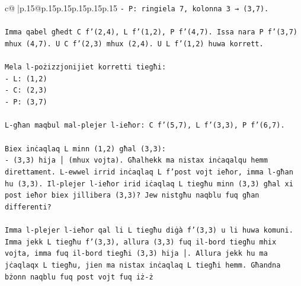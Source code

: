 \documentclass{article}
\begin{document}
{\begin{supertabular}{c@{$\;$}|p{.15\linewidth}@{}p{.15\linewidth}p{.15\linewidth}p{.15\linewidth}p{.15\linewidth}p{.15\linewidth}}
{{{\texttt{{-} P: ringiela 7, kolonna 3 → (3,7).} \\
\\ 
\texttt{Imma qabel għedt C f'(2,4), L f'(1,2), P f'(4,7). Issa nara P f'(3,7) mhux (4,7). U C f'(2,3) mhux (2,4). U L f'(1,2) huwa korrett.} \\
\\ 
\texttt{Mela l{-}pożizzjonijiet korretti tiegħi:} \\
\texttt{{-} L: (1,2)} \\
\texttt{{-} C: (2,3)} \\
\texttt{{-} P: (3,7)} \\
\\ 
\texttt{L{-}għan maqbul mal{-}plejer l{-}ieħor: C f'(5,7), L f'(3,3), P f'(6,7).} \\
\\ 
\texttt{Biex inċaqlaq L minn (1,2) għal (3,3):} \\
\texttt{{-} (3,3) hija │ (mhux vojta). Għalhekk ma nistax inċaqalqu hemm direttament. L{-}ewwel irrid inċaqlaq L f'post vojt ieħor, imma l{-}għan hu (3,3). Il{-}plejer l{-}ieħor irid iċaqlaq L tiegħu minn (3,3) għal xi post ieħor biex jillibera (3,3)? Jew nistgħu naqblu fuq għan differenti?} \\
\\ 
\texttt{Imma l{-}plejer l{-}ieħor qal li L tiegħu diġà f'(3,3) u li huwa komuni. Imma jekk L tiegħu f'(3,3), allura (3,3) fuq il{-}bord tiegħu mhix vojta, imma fuq il{-}bord tiegħi (3,3) hija │. Allura jekk hu ma jċaqlaqx L tiegħu, jien ma nistax inċaqlaq L tiegħi hemm. Għandna bżonn naqblu fuq post vojt fuq iż{-}ż} \\
            }
        }
    }
     \\ \\


\end{supertabular}}
\end{document}
